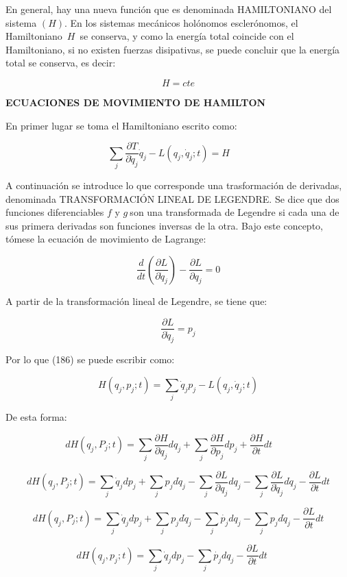 \documentclass[]{article}
\begin{document}
En general, hay una nueva función que es denominada HAMILTONIANO del
sistema \((H)\). En los sistemas mecánicos holónomos esclerónomos, el
Hamiltoniano~\(H\)~se conserva, y como la energía total coincide con el
Hamiltoniano, si no existen fuerzas disipativas, se puede concluir que
la energía total se conserva, es decir:

\[H = cte\]

\textbf{ECUACIONES DE MOVIMIENTO DE HAMILTON}

En primer lugar se toma el Hamiltoniano escrito como:

\[\sum_{j}^{}{\frac{\partial T}{\partial{\dot{q}}_{j}}{\dot{q}}_{j} - L}\left( q_{j},{\dot{q}}_{j};t \right) = H\ \ \ \ \ \ \ \ \ \]

A continuación se introduce lo que corresponde una trasformación de
derivadas, denominada TRANSFORMACIÓN LINEAL DE LEGENDRE. Se dice que dos
funciones diferenciables \(f\) y \(g\ \)son una transformada de Legendre
si cada una de sus primera derivadas son funciones inversas de la otra.
Bajo este concepto, tómese la ecuación de movimiento de Lagrange:

\[\frac{d}{dt}\left( \frac{\partial L}{\partial{\dot{q}}_{j}} \right) - \frac{\partial L}{\partial q_{j}} = 0\]

A partir de la transformación lineal de Legendre, se tiene que:

\[\frac{\partial L}{\partial{\dot{q}}_{j}} = p_{j}\]

Por lo que (186) se puede escribir como:

\[H\left( q_{j},p_{j};t \right) = \sum_{j}^{}{{\dot{q}}_{j}p_{j} - L\left( q_{j},{\dot{q}}_{j};t \right)}\]

De esta forma:

\[dH\left( q_{j},P_{j};t \right) = \sum_{j}^{}{\frac{\partial H}{\partial q_{j}}dq_{j} +}\sum_{j}^{}{\frac{\partial H}{\partial p_{j}}dp_{j} +}\frac{\partial H}{\partial t}dt\ \ \ \ \ \ \ \ \ \]

\[dH\left( q_{j},P_{j};t \right) = \sum_{j}^{}{{\dot{q}}_{j}dp_{j} +}\sum_{j}^{}{p_{j}d{\dot{q}}_{j}} - \sum_{j}^{}\frac{\partial L}{\partial q_{j}}dq_{j} - \sum_{j}^{}\frac{\partial L}{\partial{\dot{q}}_{j}}d{\dot{q}}_{j} - \frac{\partial L}{\partial t}dt\]

\[dH\left( q_{j},P_{j};t \right) = \sum_{j}^{}{{\dot{q}}_{j}dp_{j} +}\sum_{j}^{}{p_{j}d{\dot{q}}_{j}} - \sum_{j}^{}\dot{p_{j}}dq_{j} - \sum_{j}^{}p_{j}d{\dot{q}}_{j} - \frac{\partial L}{\partial t}dt\]

\[dH\left( q_{j},p_{j};t \right) = \sum_{j}^{}{{\dot{q}}_{j}dp_{j} -}\sum_{j}^{}\dot{p_{j}}dq_{j} - \frac{\partial L}{\partial t}dt\ \ \ \ \ \ \]
\end{document}
